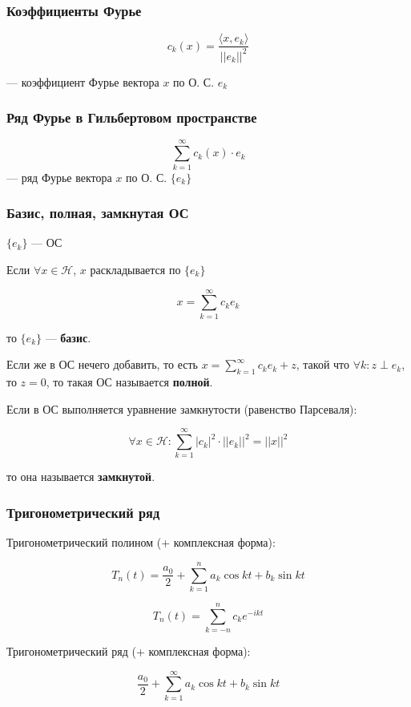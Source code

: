 \documentclass{article}
\begin{document}
\subsubsection{Коэффициенты Фурье}

\[c_k(x) = \frac{\langle x, e_k \rangle}{||e_k||^2}\]

--- коэффициент Фурье вектора $x$ по О. С. $e_k$

\subsubsection{Ряд Фурье в Гильбертовом пространстве}

\[\sum_{k = 1}^{\infty} c_k(x) \cdot e_k\]
--- ряд Фурье вектора $x$ по О. С. $\{e_k\}$

\subsubsection{Базис, полная, замкнутая ОС}

$\{e_k\}$ --- ОС

Если $\forall x \in \mathcal{H}$, $x$ раскладывается по $\{e_k\}$ 

\[x = \sum_{k = 1}^{\infty} c_k e_k\] 

то $\{e_k\}$ --- \textbf{базис}.

Если же в ОС нечего добавить, то есть $x = \sum_{k = 1}^{\infty} c_k e_k + z$, такой что $\forall k : z \perp e_k$, то $z = 0$, то такая ОС называется \textbf{полной}.

Если в ОС выполняется уравнение замкнутости (равенство Парсеваля):

\[\forall x \in \mathcal{H} : \sum_{k = 1}^{\infty} |c_k|^2 \cdot ||e_k||^2 = ||x||^2\]

то она называется \textbf{замкнутой}.


\subsubsection{Тригонометрический ряд}

Тригонометрический полином (+ комплексная форма):

\[T_n(t) = \frac{a_0}{2} + \sum_{k = 1}^{n} a_k\cos kt + b_k \sin kt\]

\[T_n(t) = \sum_{k = -n}^{n} c_k e^{-ikt}\]

Тригонометрический ряд (+ комплексная форма):

\[\frac{a_0}{2} + \sum_{k = 1}^{\infty} a_k\cos kt + b_k \sin kt\]
\end{document}

